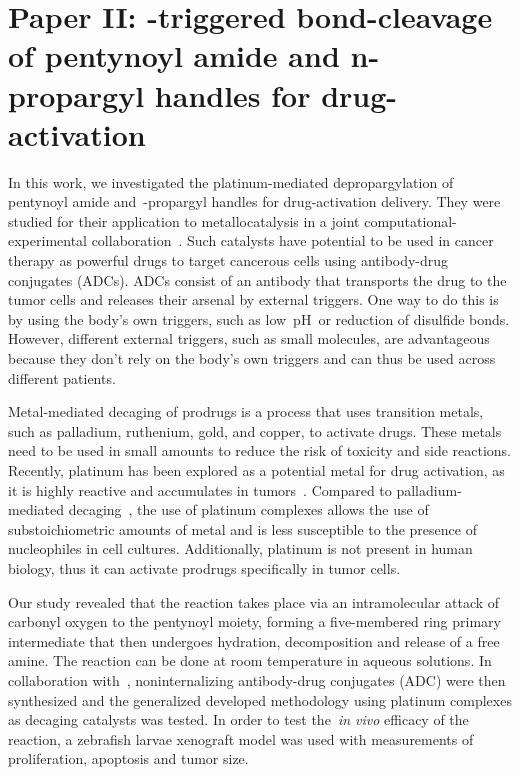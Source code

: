 \chapter{Paper II:\@
  -triggered bond-cleavage of pentynoyl amide
  and n-propargyl handles for drug-activation
 }%
\label{ch:paper2}

\begin{citacao}
\end{citacao}

In this work,
we investigated the platinum-mediated depropargylation of pentynoyl amide
and~-propargyl handles for drug-activation delivery.
They were studied for their application to metallocatalysis in a joint computational-experimental collaboration~\cite{Oliveira_2020}.
Such catalysts have potential to be used in cancer therapy as powerful drugs to target cancerous cells using antibody-drug conjugates (ADCs).
ADCs consist of an antibody that transports the drug to the tumor cells
and releases their arsenal by external triggers.
One way to do this is by using the body's own triggers,
such as low~pH~or reduction of disulfide bonds.
However,
different external triggers,
such as small molecules,
are advantageous because they don't rely on the body's own triggers and can thus be used across different patients.

Metal-mediated decaging of prodrugs is a process that uses transition metals,
such as palladium,
ruthenium,
gold,
and copper,
to activate drugs.
These metals need to be used in small amounts to reduce the risk of toxicity and side reactions.
Recently,
platinum has been explored as a potential metal for drug activation,
as it is highly reactive and accumulates in tumors~\cite{Miller_2017,Oliveira_2020}.
Compared to palladium-mediated decaging~\cite{Coelho_2019},
the use of platinum complexes allows the use of substoichiometric amounts of metal
and is less susceptible to the presence of nucleophiles in cell cultures.
Additionally,
platinum is not present in human biology,
thus it can activate prodrugs specifically in tumor cells.

Our study revealed that the reaction takes place via an intramolecular
attack of carbonyl oxygen to the pentynoyl moiety,
forming a five-membered ring primary intermediate that then undergoes hydration,
decomposition and release of a free amine.
The reaction can be done at room temperature in aqueous solutions.
In collaboration with~\citeauthor{Oliveira_2020},
noninternalizing antibody-drug conjugates (ADC)
were then synthesized
and the generalized developed methodology using platinum complexes as decaging catalysts
was tested.
In order to test the~\emph{in vivo} efficacy of the reaction,
a zebrafish larvae xenograft model was used with measurements of proliferation,
apoptosis and tumor size.

